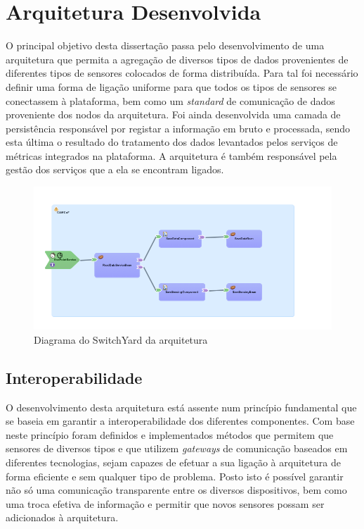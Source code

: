 \chapter{Arquitetura Desenvolvida}

O principal objetivo desta dissertação passa pelo desenvolvimento de uma arquitetura que permita a agregação de diversos tipos de dados provenientes de diferentes tipos de sensores colocados de forma distribuída. Para tal foi necessário definir uma forma de ligação uniforme para que todos os tipos de sensores se conectassem à plataforma, bem como um \textit{standard} de comunicação de dados proveniente dos nodos da arquitetura. Foi ainda desenvolvida uma camada de persistência responsável por registar a informação em bruto e processada, sendo esta última o resultado do tratamento dos dados levantados pelos serviços de métricas integrados na plataforma. A arquitetura é também responsável pela gestão dos serviços que a ela se encontram ligados.

\begin{figure}[htb]
   \centering
   \includegraphics[scale=0.55]{Images/switchyard.png}
   \caption{Diagrama do SwitchYard da arquitetura}
\end{figure}

\section{Interoperabilidade}

O desenvolvimento desta arquitetura está assente num princípio fundamental que se baseia em garantir a interoperabilidade dos diferentes componentes. Com base neste princípio foram definidos e implementados métodos que permitem que sensores de diversos tipos e que utilizem \textit{gateways} de comunicação baseados em diferentes tecnologias, sejam capazes de efetuar a sua ligação à arquitetura de forma eficiente e sem qualquer tipo de problema. Posto isto é possível garantir não só uma comunicação transparente entre os diversos dispositivos, bem como uma troca efetiva de informação e permitir que novos sensores possam ser adicionados à arquitetura\cite{vega2012smart}.

